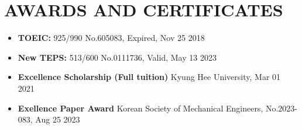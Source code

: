 \documentclass[a4paper,10pt]{extarticle}
\begin{document}
\section*{AWARDS AND CERTIFICATES}
\begin{itemize}
    \item \textbf{TOEIC:} 925/990 \hfill No.605083, Expired, Nov 25 2018
    \item \textbf{New TEPS:} 513/600 \hfill No.0111736, Valid, May 13 2023
    \item \textbf{Excellence Scholarship (Full tuition)} \hfill Kyung Hee University, Mar 01 2021
    \item \textbf{Exellence Paper Award} \hfill Korean Society of Mechanical Engineers, No.2023-083, Aug 25 2023
\end{itemize}


\end{document}
